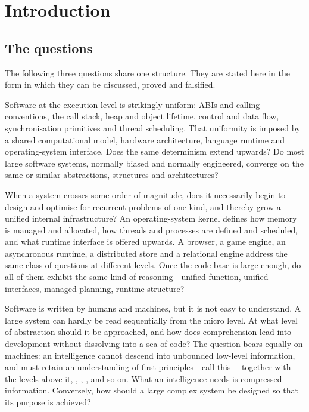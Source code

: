 \chapter{Introduction}

\section{The questions}

The following three questions share one structure. They are stated here in the form in
which they can be discussed, proved and falsified.

\begin{problem}\label{prob:low}
Software at the execution level is strikingly uniform: ABIs and calling conventions, the
call stack, heap and object lifetime, control and data flow, synchronisation primitives
and thread scheduling. That uniformity is imposed by a shared computational model,
hardware architecture, language runtime and operating-system interface. Does the same
determinism extend upwards? Do most large software systems, normally biased and normally
engineered, converge on the same or similar abstractions, structures and architectures?
\end{problem}

\begin{problem}\label{prob:scale}
When a system crosses some order of magnitude, does it necessarily begin to design and
optimise for recurrent problems of one kind, and thereby grow a unified internal
infrastructure? An operating-system kernel defines how memory is managed and allocated,
how threads and processes are defined and scheduled, and what runtime interface is
offered upwards. A browser, a game engine, an asynchronous runtime, a distributed store
and a relational engine address the same class of questions at different levels. Once the
code base is large enough, do all of them exhibit the same kind of reasoning---unified
function, unified interfaces, managed planning, runtime structure?
\end{problem}

\begin{problem}\label{prob:mind}
Software is written by humans and machines, but it is not easy to understand. A large
system can hardly be read sequentially from the micro level. At what level of abstraction
should it be approached, and how does comprehension lead into development without
dissolving into a sea of code? The question bears equally on machines: an intelligence
cannot descend into unbounded low-level information, and must retain an understanding of
first principles---call this ---together with the levels above it, , ,
, and so on. What an intelligence needs is compressed information. Conversely, how
should a large complex system be designed so that its purpose is achieved?
\end{problem}

